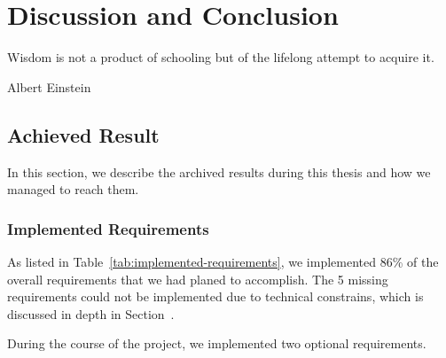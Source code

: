 \chapter{Discussion and Conclusion}
\epigraph{Wisdom is not a product of schooling but of the lifelong attempt to acquire it.}{Albert Einstein}
\section{Achieved Result}

In this section, we describe the archived results during this thesis and how we managed to reach them.

\subsection{Implemented Requirements}

As listed in Table~\ref{tab:implemented-requirements}, we implemented 86\% of the overall requirements that we had planed to accomplish. The 5 missing requirements could not be implemented due to technical constrains, which is discussed in depth in Section~.

During the course of the project, we implemented two optional requirements.

